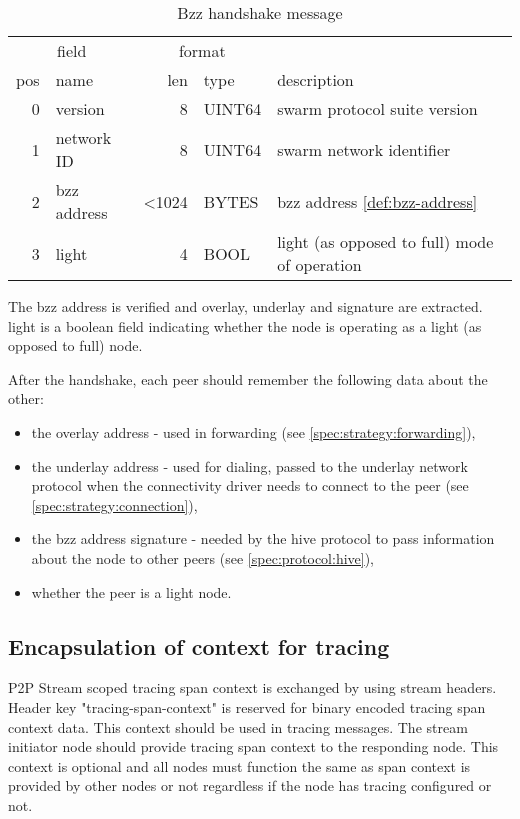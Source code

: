 \begin{definition}\label{def:bzz-handshake}

\begin{table}[]
    \centering
    \begin{tabular}{r|l|r|l|l}
\multicolumn{2}{c|}{field}& 
\multicolumn{2}{c|}{format}& 
\\
pos & name  & len & type & description \\\hline
0  & version & 8 & UINT64 & swarm protocol suite version\\\hline
1  & network ID & 8 & UINT64 & swarm network identifier\\\hline
2 & bzz address & <1024 & BYTES & bzz address \ref{def:bzz-address}\\\hline
3 & light & 4 & BOOL & light (as opposed to full) mode of operation
\end{tabular}
    \caption{Bzz handshake message}
    \label{tab:my_label}
\end{table}

\end{definition}

The bzz address is verified and overlay, underlay and signature are extracted.
light is a boolean field indicating whether the node is operating as a light (as opposed to full) node.

After the handshake,  each peer should remember the following data about the other:

\begin{itemize}
    \item the overlay address - used in forwarding  (see  \ref{spec:strategy:forwarding}),
    \item the underlay address - used for dialing, passed to the underlay network protocol when the connectivity driver needs to connect to the peer (see \ref{spec:strategy:connection}),
    \item the bzz address signature - needed by the hive protocol to pass information about the node to other peers (see \ref{spec:protocol:hive}),
    \item whether the peer is a light node.
\end{itemize}

\subsection{Encapsulation of context for tracing \statusgreen}

P2P Stream scoped tracing span context is exchanged by using stream headers. Header key "tracing-span-context" is reserved for binary encoded tracing span context data. This context should be used in tracing messages. The stream initiator node should provide tracing span context to the responding node. This context is optional and all nodes must function the same as span context is provided by other nodes or not regardless if the node has tracing configured or not.


